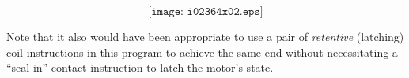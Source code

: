 $$\texttt{[image: i02364x02.eps]}$$

Note that it also would have been appropriate to use a pair of {\it retentive} (latching) coil instructions in this program to achieve the same end without necessitating a ``seal-in'' contact instruction to latch the motor's state.




